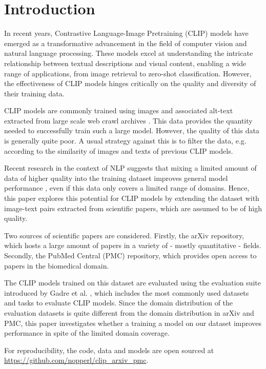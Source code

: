 \section{Introduction}

In recent years, Contrastive Language-Image Pretraining (CLIP) models \cite{DBLP:conf/icml/RadfordKHRGASAM21} have emerged as a transformative advancement in the field of computer vision and natural language processing. These models excel at understanding the intricate relationship between textual descriptions and visual content, enabling a wide range of applications, from image retrieval to zero-shot classification. However, the effectiveness of CLIP models hinges critically on the quality and diversity of their training data.

CLIP models are commonly trained using images and associated alt-text extracted from large scale web crawl archives \cite{commoncrawl}. This data provides the quantity needed to successfully train such a large model. However, the quality of this data is generally quite poor. A usual strategy against this is to filter the data, e.g. according to the similarity of images and texts of previous CLIP models.

Recent research in the context of NLP suggests that mixing a limited amount of data of higher quality into the training dataset improves general model performance \cite{xie2023doremi,madaan2022language}, even if this data only covers a limited range of domains. Hence, this paper explores this potential for CLIP models by extending the dataset with image-text pairs extracted from scientific papers, which are assumed to be of high quality.

Two sources of scientific papers are considered. Firstly, the arXiv repository, which hosts a large amount of papers in a variety of - mostly quantitative - fields. Secondly, the PubMed Central (PMC) repository, which provides open access to papers in the biomedical domain.

The CLIP models trained on this dataset are evaluated using the evaluation suite introduced by Gadre et al. \cite{DBLP:journals/corr/abs-2304-14108}, which includes the most commonly used datasets and tasks to evaluate CLIP models. Since the domain distribution of the evaluation datasets is quite different from the domain distribution in arXiv and PMC, this paper investigates whether a training a model on our dataset improves performance in spite of the limited domain coverage.

For reproducibility, the code, data and models are open sourced at \url{https://github.com/nopperl/clip_arxiv_pmc}.



